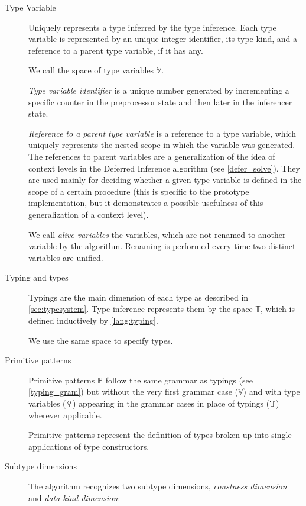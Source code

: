 \begin{description}
    \item[Type Variable] Uniquely represents a type inferred by the type inference. Each type variable is represented by an unique integer identifier, its type kind, and a reference to a parent type variable, if it has any.

    We call the space of type variables $\mathbb{V}$.

    \emph{Type variable identifier} is a unique number generated by incrementing a specific counter in the preprocessor state and then later in the inferencer state.

    \emph{Reference to a parent type variable} is a reference to a type variable, which uniquely represents the nested scope in which the variable was generated. The references to parent variables are a generalization of the idea of context levels in the Deferred Inference algorithm (see \cref{defer_solve}). They are used mainly for deciding whether a given type variable is defined in the scope of a certain procedure (this is specific to the prototype implementation, but it demonstrates a possible usefulness of this generalization of a context level).

    We call \emph{alive variables} the variables, which are not renamed to another variable by the algorithm. Renaming is performed every time two distinct variables are unified.

    \item[Typing and types] Typings are the main dimension of each type as described in \cref{sec:typesystem}. Type inference represents them by the space $\mathbb{T}$, which is defined inductively by \cref{lang:typing}.

    We use the same space to specify types.

    \item[Primitive patterns] Primitive patterns $\mathbb{P}$ follow the same grammar as typings (see \cref{typing_gram}) but without the very first grammar case ($\mathbb{V}$) and with type variables ($\mathbb{V}$) appearing in the grammar cases in place of typings ($\mathbb{T}$) wherever applicable.

    Primitive patterns represent the definition of types broken up into single applications of type constructors.

    \item[Subtype dimensions] The algorithm recognizes two subtype dimensions, \emph{constness dimension} and \emph{data kind dimension}:


\end{description}
